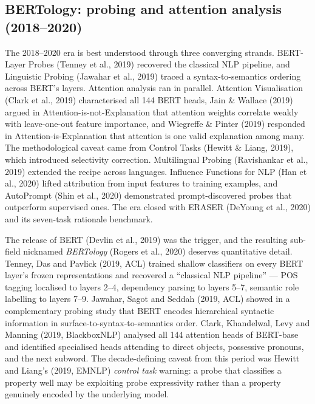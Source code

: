 \subsection{BERTology: probing and attention analysis (2018--2020)}\label{bertology-probing-and-attention-analysis-20182020}

The 2018--2020 era is best understood through three converging strands. BERT-Layer Probes (Tenney et al., 2019) recovered the classical NLP pipeline, and Linguistic Probing (Jawahar et al., 2019) traced a syntax-to-semantics ordering across BERT's layers. Attention analysis ran in parallel. Attention Visualisation (Clark et al., 2019) characterised all 144 BERT heads, Jain \& Wallace (2019) argued in Attention-is-not-Explanation that attention weights correlate weakly with leave-one-out feature importance, and Wiegreffe \& Pinter (2019) responded in Attention-is-Explanation that attention is one valid explanation among many. The methodological caveat came from Control Tasks (Hewitt \& Liang, 2019), which introduced selectivity correction. Multilingual Probing (Ravishankar et al., 2019) extended the recipe across languages. Influence Functions for NLP (Han et al., 2020) lifted attribution from input features to training examples, and AutoPrompt (Shin et al., 2020) demonstrated prompt-discovered probes that outperform supervised ones. The era closed with ERASER (DeYoung et al., 2020) and its seven-task rationale benchmark.

The release of BERT (Devlin et al., 2019) was the trigger, and the resulting sub-field nicknamed \emph{BERTology} (Rogers et al., 2020) deserves quantitative detail. Tenney, Das and Pavlick (2019, ACL) trained shallow classifiers on every BERT layer's frozen representations and recovered a ``classical NLP pipeline'' --- POS tagging localised to layers 2--4, dependency parsing to layers 5--7, semantic role labelling to layers 7--9. Jawahar, Sagot and Seddah (2019, ACL) showed in a complementary probing study that BERT encodes hierarchical syntactic information in surface-to-syntax-to-semantics order. Clark, Khandelwal, Levy and Manning (2019, BlackboxNLP) analysed all 144 attention heads of BERT-base and identified specialised heads attending to direct objects, possessive pronouns, and the next subword. The decade-defining caveat from this period was Hewitt and Liang's (2019, EMNLP) \emph{control task} warning: a probe that classifies a property well may be exploiting probe expressivity rather than a property genuinely encoded by the underlying model.

